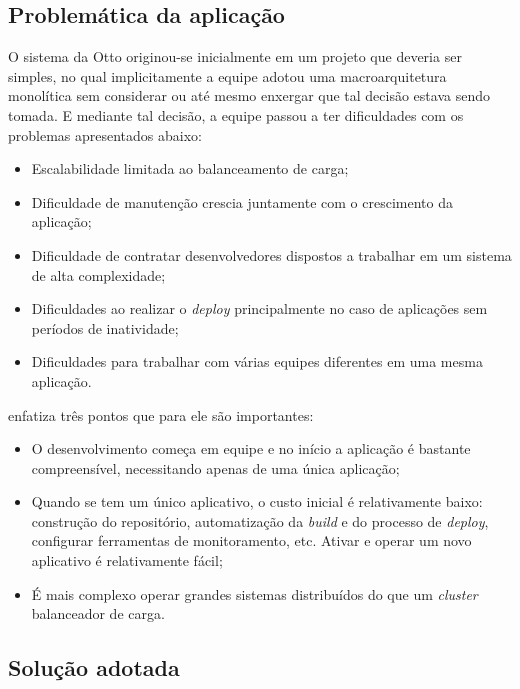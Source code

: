 \subsection{Problemática da aplicação}

O sistema da Otto originou-se inicialmente em um projeto que deveria ser simples, no qual
implicitamente a equipe adotou uma macroarquitetura monolítica sem considerar ou até mesmo enxergar
que tal decisão estava sendo tomada. E mediante tal decisão, a equipe passou a ter dificuldades
com os problemas apresentados abaixo:

\begin{itemize}
    \item Escalabilidade limitada ao balanceamento de carga;
    \item Dificuldade de manutenção crescia juntamente com o crescimento da aplicação;
    \item Dificuldade de contratar desenvolvedores dispostos a trabalhar em um sistema de alta
        complexidade;
    \item Dificuldades ao realizar o \textit{deploy} principalmente no caso de aplicações sem
        períodos de inatividade;
    \item Dificuldades para trabalhar com várias equipes diferentes em uma mesma aplicação.
\end{itemize}

 enfatiza três pontos que para ele são importantes:

\begin{itemize}
    \item O desenvolvimento começa em equipe e no início a aplicação é bastante compreensível,
        necessitando apenas de uma única aplicação;
    \item Quando se tem um único aplicativo, o custo inicial é relativamente baixo: construção do
        repositório, automatização da \textit{build} e do processo de \textit{deploy}, configurar
        ferramentas de monitoramento, etc. Ativar e operar um novo aplicativo é relativamente fácil;
    \item É mais complexo operar grandes sistemas distribuídos do que um \textit{cluster}
        balanceador de carga.
\end{itemize}

\subsection{Solução adotada}

